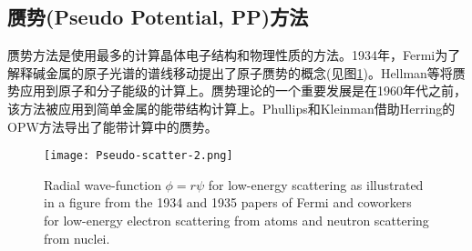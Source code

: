 
\subsection{赝势(Pseudo Potential, PP)方法}
赝势方法是使用最多的计算晶体电子结构和物理性质的方法。1934年，Fermi为了解释碱金属的原子光谱的谱线移动提出了原子赝势的概念(见图\ref{Pseudo-scatter-2})\cite{nc11-157_1934,ajp52-695_1984}。Hellman等将赝势应用到原子和分子能级的计算上\cite{jcp3-61_1935}。赝势理论的一个重要发展是在1960年代之前，该方法被应用到简单金属的能带结构计算上。Phullips和Kleinman借助Herring的OPW方法导出了能带计算中的赝势\cite{pr116-287_1959}。
\begin{figure}[h!]
\centering
\vspace*{-0.25in}
\texttt{[image: Pseudo-scatter-2.png]}
\caption{{\textrm{Radial wave-function $\phi=r\psi$ for low-energy scattering as illustrated in a figure from the 1934 and 1935 papers of Fermi and coworkers for low-energy electron scattering from atoms and neutron scattering from nuclei.}}}%
\label{Pseudo-scatter-2}
\end{figure}

